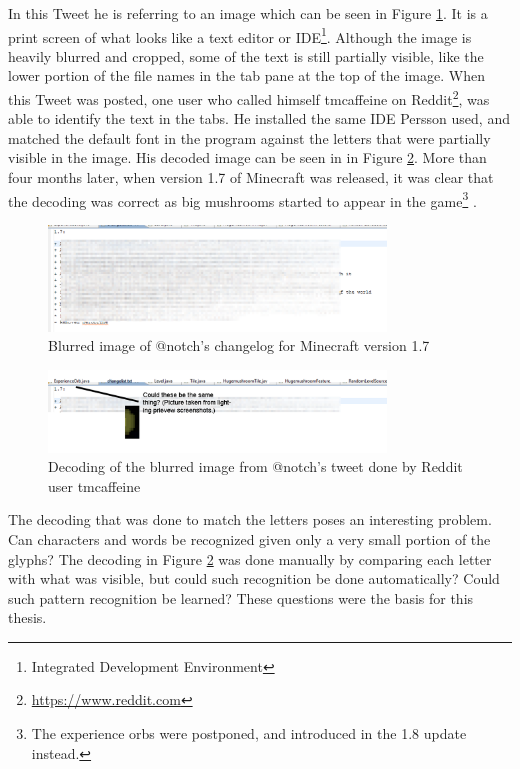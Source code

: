 In this Tweet he is referring to an image which can be seen in Figure \ref{fig:notch_imgur}. It is a print screen of what looks like a text editor or IDE\footnote{Integrated Development Environment}. Although the image is heavily blurred and cropped, some of the text is still partially visible, like the lower portion of the file names in the tab pane at the top of the image. When this Tweet was posted, one user who called himself tmcaffeine on Reddit\footnote{\url{https://www.reddit.com}}, was able to identify the text in the tabs. He installed the same IDE Persson used, and matched the default font in the program against the letters that were partially visible in the image. His decoded image can be seen in in Figure \ref{fig:notch_eclipse_decoded}. More than four months later, when version 1.7 of Minecraft was released, it was clear that the decoding was correct as big mushrooms started to appear in the game\footnote{The experience orbs were postponed, and introduced in the 1.8 update instead.} \citep{misc-minecraft.172-changelog}.

\begin{figure}[h]
    \centering
    \includegraphics[width=0.8\textwidth]{fig/chapter1/notch_eclipse.png}
    \caption{Blurred image of @notch's changelog for Minecraft version 1.7}
    \label{fig:notch_imgur}
\end{figure}

\begin{figure}[ht]
    \centering
    \includegraphics[width=0.8\textwidth]{fig/chapter1/notch_eclipse_decoded.png}
    \caption{Decoding of the blurred image from @notch's tweet done by Reddit user tmcaffeine}
    \label{fig:notch_eclipse_decoded}
\end{figure}

The decoding that was done to match the letters poses an interesting problem. Can characters and words be recognized given only a very small portion of the glyphs? The decoding in Figure \ref{fig:notch_eclipse_decoded} was done manually by comparing each letter with what was visible, but could such recognition be done automatically? Could such pattern recognition be learned? These questions were the basis for this thesis.

